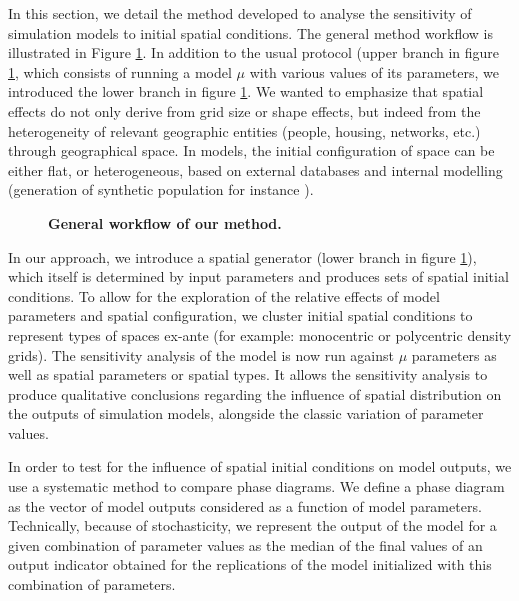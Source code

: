 \documentclass[Royal,sageh,times]{sagej}
\begin{document}
In this section, we detail the method developed to analyse the sensitivity of simulation models to initial spatial conditions. The general method workflow is illustrated in Figure \ref{fig:method}. In addition to the usual protocol (upper branch in figure \ref{fig:method}, which consists of running a model $\mu$ with various values of its parameters, we introduced the lower branch in figure \ref{fig:method}. We wanted to emphasize that spatial effects do not only derive from grid size or shape effects, but indeed from the heterogeneity of relevant geographic entities (people, housing, networks, etc.) through geographical space. In models, the initial configuration of space can be either flat, or heterogeneous,  based on external databases and internal modelling (generation of synthetic population for instance \citep{bhat1999activity}).
\begin{figure}[htbp] \begin{center} 
 \caption{\textbf{General workflow of our method.}} \label{fig:method} \end{center} \end{figure} %

In our approach, we introduce a spatial generator (lower branch in figure \ref{fig:method}), which itself is determined by input parameters and produces sets of spatial initial conditions. 
To allow for the exploration of the relative effects of model parameters and spatial configuration, we cluster initial spatial conditions  to represent types of spaces ex-ante (for example: monocentric or polycentric density grids). The sensitivity analysis of the model is now run against $\mu$ parameters as well as spatial parameters or spatial types. It allows the sensitivity analysis to produce qualitative conclusions regarding the influence of spatial distribution on the outputs of simulation models, alongside the classic variation of parameter values.

In order to test for the influence of spatial initial conditions on model outputs, we use a systematic method to compare phase diagrams. We define a phase diagram as the vector of model outputs considered as a function of model parameters. Technically, because of stochasticity, we represent the output of the model for a given combination of parameter values as the median of the final values of an output indicator obtained for the replications of the model initialized with this combination of parameters.\\
\end{document}
